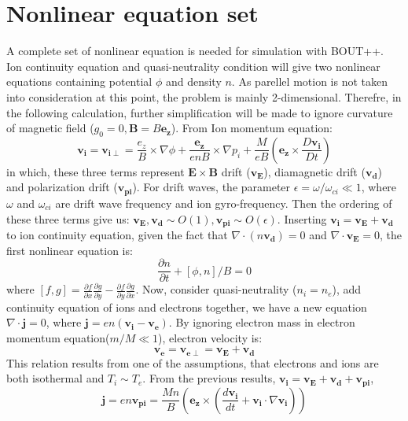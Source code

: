\documentclass{article}
\begin{document}
\section{Nonlinear equation set}
A complete set of nonlinear equation is needed for simulation with BOUT++. Ion continuity equation and quasi-neutrality condition will give two nonlinear equations containing potential $\phi$ and density $n$. As parellel motion is not taken into consideration at this point, the problem is mainly 2-dimensional. Therefre, in the following calculation, further simplification will be made to ignore curvature of magnetic field ($g_0=0, \bm{B}=B\bm{e_z}$). From Ion momentum equation:
\begin{equation}
\bm{v_i}=\bm{v_{i\perp}}=\frac{e_z}{B}\times\nabla\phi+\frac{\bm{e_z}}{enB}\times\nabla p_i+\frac{M}{eB}\left(\bm{e_z}\times\frac{D\bm{v_i}}{D t}\right)
\label{eq4}
\end{equation}
in which, these three terms represent $\bm{E}\times\bm{B}$ drift ($\bm{v_E}$), diamagnetic drift ($\bm{v_d}$) and polarization drift ($\bm{v_{pi}}$). For drift waves, the parameter $\epsilon=\omega/\omega_{ci}\ll 1$, where $\omega$ and $\omega_{ci}$ are drift wave frequency and ion gyro-frequency. Then the ordering of these three terms give us: $\bm{v_E},\bm{v_d}\sim O(1), \bm{v_{pi}}\sim O(\epsilon)$. Inserting $\bm{v_i}=\bm{v_E}+\bm{v_d}$ to ion continuity equation, given the fact that $\nabla\cdot (n\bm{v_d})=0$ and $\nabla\cdot\bm{v_E}=0$, the first nonlinear equation is:
\begin{equation}
\frac{\partial n}{\partial t}+[\phi, n]/B=0
\label{eq5}
\end{equation}
where $\displaystyle [f,g]=\frac{\partial f}{\partial x}\frac{\partial g}{\partial y}-\frac{\partial f}{\partial y}\frac{\partial g}{\partial x}$.
Now, consider quasi-neutrality ($n_i=n_e$), add continuity equation of ions and electrons together, we have a new equation $\nabla\cdot\bm{j}=0$, where $\bm{j}=e n(\bm{v_i}-\bm{v_e})$. By ignoring electron mass in electron momentum equation($m/M\ll 1$), electron velocity is:
\begin{equation}
\bm{v_e}=\bm{v_{e\perp}}=\bm{v_E}+\bm{v_d}
\label{eq6}
\end{equation}
This relation results from one of the assumptions, that electrons and ions are both isothermal and $T_i\sim T_e$. From the previous results, $\bm{v_i}=\bm{v_E}+\bm{v_d}+\bm{v_{pi}}$,
\begin{equation}
\bm{j}=en\bm{v_{pi}}=\frac{M n}{B}\left(\bm{e_z}\times\left(\frac{d \bm{v_i}}{d t}+\bm{v_i}\cdot\nabla\bm{v_i}\right)\right)
\label{eq7}
\end{equation}
\end{document}
